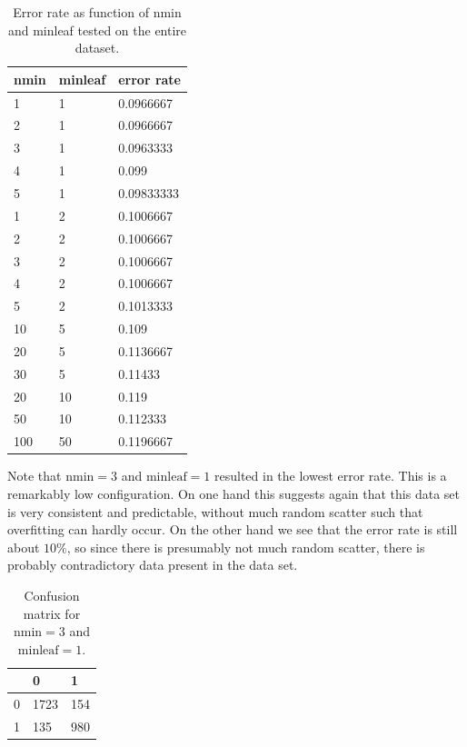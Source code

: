 \documentclass[12pt]{article}
\theoremstyle{definition}
\begin{document}
\begin{table}[h]
\centering
\begin{tabular}{lll}
    nmin & minleaf & error rate \\
    \hline \hline
    1 & 1  & 0.0966667 \\
    2 & 1  & 0.0966667 \\
    3 & 1  & 0.0963333 \\
    4 & 1  & 0.099 \\
    5 & 1  & 0.09833333 \\
    1 & 2  & 0.1006667 \\
    2 & 2  & 0.1006667 \\
    3 & 2  & 0.1006667 \\
    4 & 2  & 0.1006667 \\
    5 & 2  & 0.1013333 \\
    10 & 5  & 0.109 \\
    20 & 5  & 0.1136667 \\
    30 & 5  & 0.11433 \\
    20 & 10 & 0.119 \\
    50 & 10 & 0.112333 \\
    100 & 50 & 0.1196667 \\
\end{tabular}
\caption{Error rate as function of nmin and minleaf tested on the entire dataset.}
\label{table1}
\end{table}

Note that $\mathrm{nmin} = 3$ and $\mathrm{minleaf} = 1$ resulted in the lowest error rate.
This is a remarkably low configuration.
On one hand this suggests again that this data set is very consistent and predictable,
without much random scatter such that overfitting can hardly occur.
On the other hand we see that the error rate is still about $10\%$, so since there is presumably
not much random scatter, there is probably contradictory data present in the data set.

\begin{table}[h]
\centering
\begin{tabular}{r||ll}
     & 0    & 1   \\
    \hline \hline
    0 & 1723 & 154 \\
    1 & 135  & 980 \\
\end{tabular}
\caption{Confusion matrix for $\mathrm{nmin} = 3$ and $\mathrm{minleaf} = 1$.}
\label{table2}
\end{table}
\end{document}

